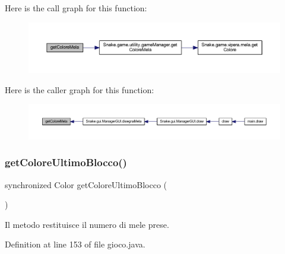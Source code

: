 Here is the call graph for this function\+:
\nopagebreak
\begin{figure}[H]
\begin{center}
\leavevmode
\includegraphics[width=350pt]{class_snake_1_1game_1_1gioco_a054f84dfe4bbfc78f789a4dc4203794b_cgraph}
\end{center}
\end{figure}
Here is the caller graph for this function\+:
\nopagebreak
\begin{figure}[H]
\begin{center}
\leavevmode
\includegraphics[width=350pt]{class_snake_1_1game_1_1gioco_a054f84dfe4bbfc78f789a4dc4203794b_icgraph}
\end{center}
\end{figure}
\mbox{\label{class_snake_1_1game_1_1gioco_aa28f45b4849720b24778146d20f7be0b}} 
\subsubsection{\texorpdfstring{get\+Colore\+Ultimo\+Blocco()}{getColoreUltimoBlocco()}}
{\footnotesize\ttfamily synchronized Color get\+Colore\+Ultimo\+Blocco (\begin{DoxyParamCaption}{ }\end{DoxyParamCaption})}



Il metodo restituisce il numero di mele prese. 



Definition at line 153 of file gioco.\+java.

